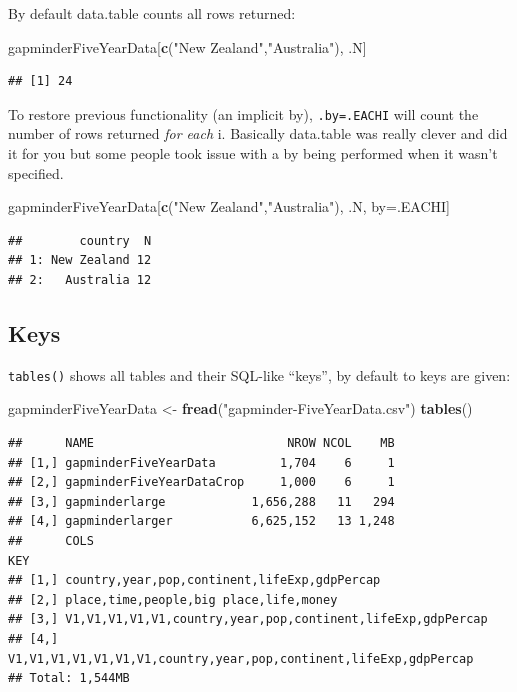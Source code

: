 \documentclass[]{article}
\newenvironment{Shaded}{\begin{snugshade}}{\end{snugshade}}
\newcommand{\KeywordTok}[1]{\textcolor[rgb]{0.13,0.29,0.53}{\textbf{{#1}}}}
\newcommand{\StringTok}[1]{\textcolor[rgb]{0.31,0.60,0.02}{{#1}}}
\newcommand{\NormalTok}[1]{{#1}}
\begin{document}
By default data.table counts all rows returned:

\begin{Shaded}
\begin{Highlighting}[]
\NormalTok{gapminderFiveYearData[}\KeywordTok{c}\NormalTok{(}\StringTok{"New Zealand"}\NormalTok{,}\StringTok{"Australia"}\NormalTok{), .N]}
\end{Highlighting}
\end{Shaded}

\begin{verbatim}
## [1] 24
\end{verbatim}

To restore previous functionality (an implicit by), \texttt{.by=.EACHI}
will count the number of rows returned \emph{for each} i. Basically
data.table was really clever and did it for you but some people took
issue with a by being performed when it wasn't specified.

\begin{Shaded}
\begin{Highlighting}[]
\NormalTok{gapminderFiveYearData[}\KeywordTok{c}\NormalTok{(}\StringTok{"New Zealand"}\NormalTok{,}\StringTok{"Australia"}\NormalTok{), .N, by=.EACHI]}
\end{Highlighting}
\end{Shaded}

\begin{verbatim}
##        country  N
## 1: New Zealand 12
## 2:   Australia 12
\end{verbatim}

\subsection{Keys}\label{keys}

\texttt{tables()} shows all tables and their SQL-like ``keys'', by
default to keys are given:

\begin{Shaded}
\begin{Highlighting}[]
\NormalTok{gapminderFiveYearData <-}\StringTok{ }\KeywordTok{fread}\NormalTok{(}\StringTok{"gapminder-FiveYearData.csv"}\NormalTok{)}
\KeywordTok{tables}\NormalTok{()}
\end{Highlighting}
\end{Shaded}

\begin{verbatim}
##      NAME                           NROW NCOL    MB
## [1,] gapminderFiveYearData         1,704    6     1
## [2,] gapminderFiveYearDataCrop     1,000    6     1
## [3,] gapminderlarge            1,656,288   11   294
## [4,] gapminderlarger           6,625,152   13 1,248
##      COLS                                                              KEY
## [1,] country,year,pop,continent,lifeExp,gdpPercap                         
## [2,] place,time,people,big place,life,money                               
## [3,] V1,V1,V1,V1,V1,country,year,pop,continent,lifeExp,gdpPercap          
## [4,] V1,V1,V1,V1,V1,V1,V1,country,year,pop,continent,lifeExp,gdpPercap    
## Total: 1,544MB
\end{verbatim}
\end{document}
